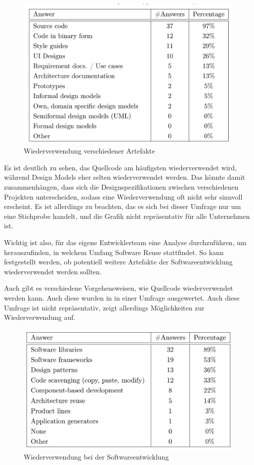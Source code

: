 \documentclass[utf8,biblatex]{lni}
\begin{document}
\begin{figure}[h]
  \centering
  \includegraphics[width=.8\textwidth]{images/image1.png}
  \caption{Wiederverwendung verschiedener Artefakte}
  \label{fig:image1}
\end{figure}

Es ist deutlich zu sehen, das Quellcode am häufigsten wiederverwendet wird, während Design Models eher selten wiederverwendet werden. Das könnte damit zusammenhängen, dass sich die Designspezifikationen zwischen verschiedenen Projekten unterscheiden, sodass eine Wiederverwendung oft nicht sehr sinnvoll erscheint. Es ist allerdings zu beachten, das es sich bei dieser Umfrage nur um eine Stichprobe handelt, und die Grafik nicht repräsentativ für alle Unternehmen ist. 

Wichtig ist also, für das eigene Entwicklerteam eine Analyse durchzuführen, um herauszufinden, in welchem Umfang Software Reuse stattfindet. So kann festgestellt werden, ob potentiell weitere Artefakte der Softwareentwicklung wiederverwendet werden sollten.


Auch gibt es verschiedene Vorgehensweisen, wie Quellcode wiederverwendet werden kann. Auch diese wurden in \cite{WilliamB.FrakesandChristopherJ.Fox.1996} in einer Umfrage ausgewertet. Auch diese Umfrage ist nicht repräsentativ, zeigt allerdings Möglichkeiten zur Wiederverwendung auf. 

\begin{figure}[h]
  \centering
  \includegraphics[width=.8\textwidth]{images/image2.png}
  \caption{Wiederverwendung bei der Softwareentwicklung}
  \label{fig:image2}
\end{figure}
\end{document}
